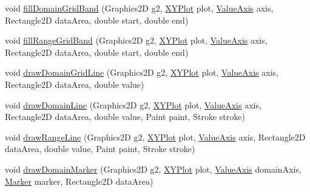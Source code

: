 \begin{DoxyCompactItemize}
\item 
void \mbox{\hyperlink{classorg_1_1jfree_1_1chart_1_1renderer_1_1xy_1_1_abstract_x_y_item_renderer_a6251d146130d6c18f5478825e587d715}{fill\+Domain\+Grid\+Band}} (Graphics2D g2, \mbox{\hyperlink{classorg_1_1jfree_1_1chart_1_1plot_1_1_x_y_plot}{X\+Y\+Plot}} plot, \mbox{\hyperlink{classorg_1_1jfree_1_1chart_1_1axis_1_1_value_axis}{Value\+Axis}} axis, Rectangle2D data\+Area, double start, double end)
\item 
void \mbox{\hyperlink{classorg_1_1jfree_1_1chart_1_1renderer_1_1xy_1_1_abstract_x_y_item_renderer_ae9f1ce1d97db3aa47f1ae51d8620474c}{fill\+Range\+Grid\+Band}} (Graphics2D g2, \mbox{\hyperlink{classorg_1_1jfree_1_1chart_1_1plot_1_1_x_y_plot}{X\+Y\+Plot}} plot, \mbox{\hyperlink{classorg_1_1jfree_1_1chart_1_1axis_1_1_value_axis}{Value\+Axis}} axis, Rectangle2D data\+Area, double start, double end)
\item 
void \mbox{\hyperlink{classorg_1_1jfree_1_1chart_1_1renderer_1_1xy_1_1_abstract_x_y_item_renderer_a9566024f14261f5f7f86c39ae430ad87}{draw\+Domain\+Grid\+Line}} (Graphics2D g2, \mbox{\hyperlink{classorg_1_1jfree_1_1chart_1_1plot_1_1_x_y_plot}{X\+Y\+Plot}} plot, \mbox{\hyperlink{classorg_1_1jfree_1_1chart_1_1axis_1_1_value_axis}{Value\+Axis}} axis, Rectangle2D data\+Area, double value)
\item 
void \mbox{\hyperlink{classorg_1_1jfree_1_1chart_1_1renderer_1_1xy_1_1_abstract_x_y_item_renderer_af6625bfd240c8187dba5e52fdf7edd58}{draw\+Domain\+Line}} (Graphics2D g2, \mbox{\hyperlink{classorg_1_1jfree_1_1chart_1_1plot_1_1_x_y_plot}{X\+Y\+Plot}} plot, \mbox{\hyperlink{classorg_1_1jfree_1_1chart_1_1axis_1_1_value_axis}{Value\+Axis}} axis, Rectangle2D data\+Area, double value, Paint paint, Stroke stroke)
\item 
void \mbox{\hyperlink{classorg_1_1jfree_1_1chart_1_1renderer_1_1xy_1_1_abstract_x_y_item_renderer_a3c0b851f7cafb14bc62262c0a7766ad6}{draw\+Range\+Line}} (Graphics2D g2, \mbox{\hyperlink{classorg_1_1jfree_1_1chart_1_1plot_1_1_x_y_plot}{X\+Y\+Plot}} plot, \mbox{\hyperlink{classorg_1_1jfree_1_1chart_1_1axis_1_1_value_axis}{Value\+Axis}} axis, Rectangle2D data\+Area, double value, Paint paint, Stroke stroke)
\item 
void \mbox{\hyperlink{classorg_1_1jfree_1_1chart_1_1renderer_1_1xy_1_1_abstract_x_y_item_renderer_a5a1abb050a477c95a4f4ada6bfec4d02}{draw\+Domain\+Marker}} (Graphics2D g2, \mbox{\hyperlink{classorg_1_1jfree_1_1chart_1_1plot_1_1_x_y_plot}{X\+Y\+Plot}} plot, \mbox{\hyperlink{classorg_1_1jfree_1_1chart_1_1axis_1_1_value_axis}{Value\+Axis}} domain\+Axis, \mbox{\hyperlink{classorg_1_1jfree_1_1chart_1_1plot_1_1_marker}{Marker}} marker, Rectangle2D data\+Area)

\end{DoxyCompactItemize}
